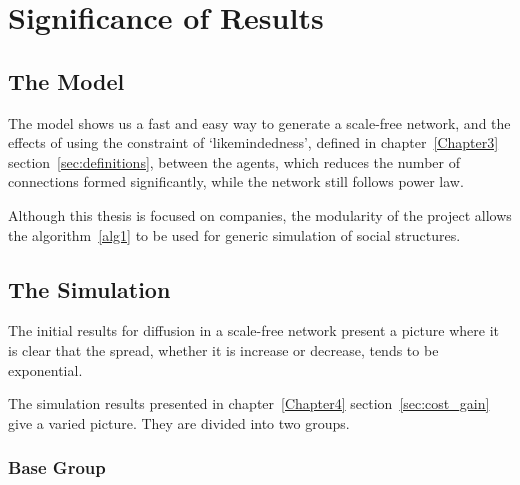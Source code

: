 
\chapter{Significance of Results} %

\label{Chapter5} %



\section{The Model}
The model shows us a fast and easy way to generate a scale-free network, and the effects of using the constraint of `likemindedness', defined in chapter~\ref{Chapter3} section~\ref{sec:definitions}, between the agents, which reduces the number of connections formed significantly, while the network still follows power law.

Although this thesis is focused on companies, the modularity of the project allows the algorithm~\ref{alg1} to be used for generic simulation of social structures.


\section{The Simulation}

The initial results for diffusion in a scale-free network present a picture where it is clear that the spread, whether it is increase or decrease, tends to be exponential. 

The simulation results presented in chapter~\ref{Chapter4} section~\ref{sec:cost_gain} give a varied picture. They are divided into two groups.

\subsection{Base Group}

